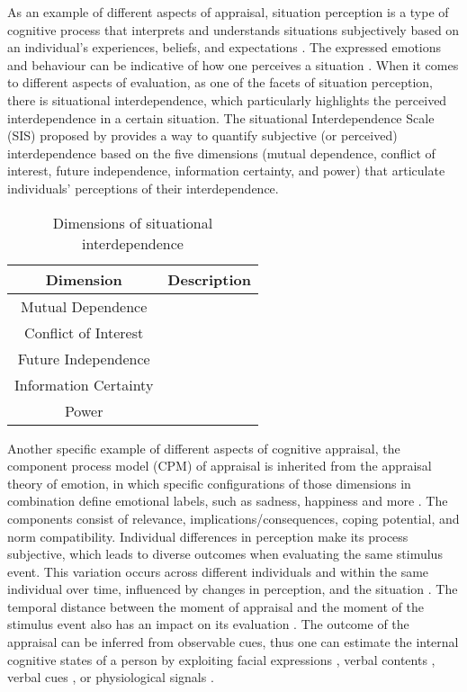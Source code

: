 As an example of different aspects of appraisal, situation perception is a type of cognitive process that interprets and understands situations subjectively based on an individual's experiences, beliefs, and expectations \cite{tekoppele2023we}. The expressed emotions and behaviour can be indicative of how one perceives a situation \cite{hess2020bidirectional, horstmann2019situational}. When it comes to different aspects of evaluation, as one of the facets of situation perception, there is situational interdependence, which particularly highlights the perceived interdependence in a certain situation. The situational Interdependence Scale (SIS) proposed by \citeauthor{gerpott2017howdopeople} \cite{gerpott2017howdopeople} provides a way to quantify subjective (or perceived) interdependence based on the five dimensions (mutual dependence, conflict of interest, future independence, information certainty, and power) that articulate individuals' perceptions of their interdependence. 

\begin{table}
    \centering
    \begin{tabular}{|c|l|} \hline
        Dimension & Description\\\hline
       Mutual Dependence  & \\
       Conflict of Interest  & \\
       Future Independence  & \\
       Information Certainty  & \\
       Power  & \\ \hline
    \end{tabular}
    \caption{Dimensions of situational interdependence \cite{gerpott2017howdopeople}}
    \label{tab:sis_dimensions}
\end{table}

Another specific example of different aspects of cognitive appraisal, the component process model (CPM) of appraisal is inherited from the appraisal theory of emotion, in which specific configurations of those dimensions in combination define emotional labels, such as sadness, happiness and more \cite{sander2005systems, scherer2013nature}. The components consist of relevance, implications/consequences, coping potential, and norm compatibility. Individual differences in perception make its process subjective, which leads to diverse outcomes when evaluating the same stimulus event. This variation occurs across different individuals and within the same individual over time, influenced by changes in perception, and the situation \cite{dudzik2023valid}. The temporal distance between the moment of appraisal and the moment of the stimulus event also has an impact on its evaluation \cite{trope2003temporal}. The outcome of the appraisal can be inferred from observable cues, thus one can estimate the internal cognitive states of a person by exploiting facial expressions \cite{kaiser2001facial}, verbal contents \cite{}, verbal cues \cite{Lotfian2019building}, or physiological signals \cite{}. 

